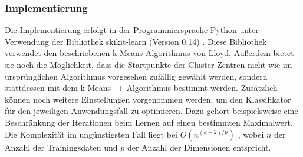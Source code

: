 





\subsubsection{Implementierung} \label{subsubsec:kMeansImpl}
Die Implementierung erfolgt in der Programmiersprache Python unter Verwendung der Bibliothek skikit-learn (Version 0.14) \cite{sklearn}. Diese Bibliothek verwendet den beschriebenen k-Means Algorithmus von Lloyd. Außerdem bietet sie noch die Möglichkeit, dass die Startpunkte der Cluster-Zentren nicht wie im ursprünglichen Algorithmus vorgesehen zufällig gewählt werden, sondern stattdessen mit dem k-Means++ Algorithmus \cite{kMeans++} bestimmt werden. Zusätzlich können noch weitere 
Einstellungen vorgenommen werden, um den Klassifikator für den jeweiligen Anwendungsfall  zu optimieren. Dazu gehört beispielsweise eine Beschränkung der Iterationen beim Lernen auf einen bestimmten Maximalwert.
Die Komplexität im ungünstigsten Fall liegt bei $O(n^{(k+2)/p})$ \cite{sklearn.kmeans, kMeansHowSlow}, wobei $n$ der Anzahl der Trainingsdaten und $p$ der Anzahl der Dimensionen entspricht.



